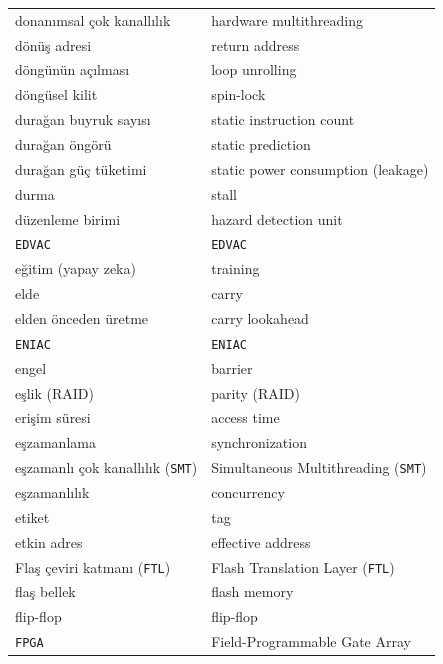 {\begin{longtable}{@{}p{7.6cm}p{7.6cm}@{}}
donanımsal çok kanallılık & hardware multithreading \\
dönüş adresi & return address \\
döngünün açılması & loop unrolling \\
döngüsel kilit & spin-lock \\
durağan buyruk sayısı & static instruction count \\
durağan öngörü & static prediction \\
durağan güç tüketimi & static power consumption (leakage) \\
durma & stall \\
düzenleme birimi & hazard detection unit \\

\texttt{EDVAC} & \texttt{EDVAC} \\
eğitim (yapay zeka) & training \\
elde & carry \\
elden önceden üretme & carry lookahead \\
\texttt{ENIAC} & \texttt{ENIAC} \\
engel & barrier \\
eşlik (RAID) & parity (RAID) \\
erişim süresi & access time \\
eşzamanlama & synchronization \\
eşzamanlı çok kanallılık (\texttt{SMT}) & Simultaneous Multithreading (\texttt{SMT}) \\
eşzamanlılık & concurrency \\
etiket & tag \\
etkin adres & effective address \\

Flaş çeviri katmanı (\texttt{FTL}) & Flash Translation Layer (\texttt{FTL}) \\
flaş bellek & flash memory \\
flip-flop & flip-flop \\
\texttt{FPGA} & Field-Programmable Gate Array \\


\end{longtable}}
